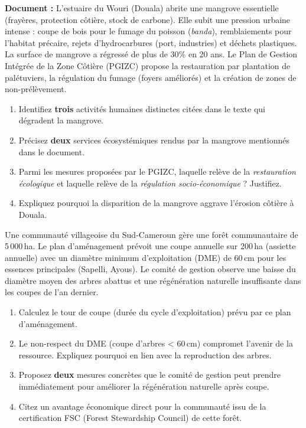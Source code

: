 \documentclass[11pt]{article}
\begin{document}
\begin{exercice}
\textbf{Document :} L'estuaire du Wouri (Douala) abrite une mangrove essentielle (frayères, protection côtière, stock de carbone). Elle subit une pression urbaine intense : coupe de bois pour le fumage du poisson (\textit{banda}), remblaiements pour l'habitat précaire, rejets d'hydrocarbures (port, industries) et déchets plastiques. La surface de mangrove a régressé de plus de 30\% en 20 ans. Le Plan de Gestion Intégrée de la Zone Côtière (PGIZC) propose la restauration par plantation de palétuviers, la régulation du fumage (foyers améliorés) et la création de zones de non-prélèvement.

\begin{enumerate}
    \item Identifiez \textbf{trois} activités humaines distinctes citées dans le texte qui dégradent la mangrove.
    \item Précisez \textbf{deux} services écosystémiques rendus par la mangrove mentionnés dans le document.
    \item Parmi les mesures proposées par le PGIZC, laquelle relève de la \textit{restauration écologique} et laquelle relève de la \textit{régulation socio-économique} ? Justifiez.
    \item Expliquez pourquoi la disparition de la mangrove aggrave l'érosion côtière à Douala.
\end{enumerate}
\end{exercice}

\begin{exercice}
Une communauté villageoise du Sud-Cameroun gère une forêt communautaire de 5\,000\,ha. Le plan d'aménagement prévoit une coupe annuelle sur 200\,ha (assiette annuelle) avec un diamètre minimum d'exploitation (DME) de 60\,cm pour les essences principales (Sapelli, Ayous). Le comité de gestion observe une baisse du diamètre moyen des arbres abattus et une régénération naturelle insuffisante dans les coupes de l'an dernier.

\begin{enumerate}
    \item Calculez le tour de coupe (durée du cycle d'exploitation) prévu par ce plan d'aménagement.
    \item Le non-respect du DME (coupe d'arbres < 60\,cm) compromet l'avenir de la ressource. Expliquez pourquoi en lien avec la reproduction des arbres.
    \item Proposez \textbf{deux} mesures concrètes que le comité de gestion peut prendre immédiatement pour améliorer la régénération naturelle après coupe.
    \item Citez un avantage économique direct pour la communauté issu de la certification FSC (Forest Stewardship Council) de cette forêt.
\end{enumerate}
\end{exercice}
\end{document}
